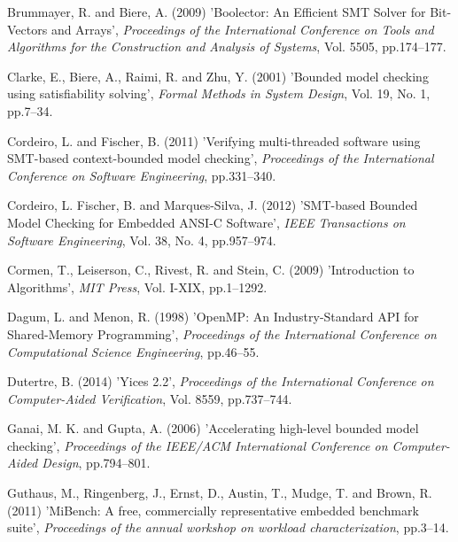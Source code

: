 \documentclass{doublecol-new}
\theoremstyle{TH}{
\newtheorem{lemma}{Lemma}
\newtheorem{theorem}[lemma]{Theorem}
\newtheorem{corrolary}[lemma]{Corrolary}
\newtheorem{conjecture}[lemma]{Conjecture}
\newtheorem{proposition}[lemma]{Proposition}
\newtheorem{claim}[lemma]{Claim}
\newtheorem{stheorem}[lemma]{Wrong Theorem}
\newtheorem{algorithm}{Algorithm}
}
\theoremstyle{THrm}{
\newtheorem{definition}{Definition}[section]
\newtheorem{question}{Question}[section]
\newtheorem{remark}{Remark}
\newtheorem{scheme}{Scheme}
}
\theoremstyle{THhit}{
\newtheorem{case}{Case}[section]
}
\begin{document}
\begin{thebibliography}{10}
Brummayer, R. and Biere, A. (2009) 'Boolector: An Efficient SMT Solver for Bit-Vectors and Arrays', {\it Proceedings of the International Conference on Tools and Algorithms for the Construction and Analysis of Systems}, Vol. 5505, pp.174--177.

Clarke, E., Biere, A., Raimi, R. and Zhu, Y. (2001) 'Bounded model checking using satisfiability solving', {\it Formal Methods in System Design}, Vol. 19, No. 1, pp.7--34.

Cordeiro, L. and Fischer, B. (2011) 'Verifying multi-threaded software using SMT-based context-bounded model checking', {\it Proceedings of the International Conference on Software Engineering}, pp.331--340.

Cordeiro, L. Fischer, B. and Marques-Silva, J. (2012) 'SMT-based Bounded Model Checking for Embedded ANSI-C Software', {\it IEEE Transactions on Software Engineering}, Vol. 38, No. 4, pp.957--974.


Cormen, T., Leiserson, C., Rivest, R. and Stein, C. (2009) 'Introduction to Algorithms', {\it MIT Press}, Vol. I-XIX, pp.1--1292.

Dagum, L. and Menon, R. (1998) 'OpenMP: An Industry-Standard API for Shared-Memory Programming', {\it Proceedings of the International Conference on Computational Science Engineering}, pp.46--55.

Dutertre, B. (2014) 'Yices 2.2', {\it Proceedings of the International Conference on Computer-Aided Verification}, Vol. 8559, pp.737--744.

Ganai, M. K. and Gupta, A. (2006) 'Accelerating high-level bounded model checking', {\it Proceedings of the IEEE/ACM International Conference on Computer-Aided Design}, pp.794--801.

Guthaus, M., Ringenberg, J., Ernst, D., Austin, T., Mudge, T. and Brown, R. (2011) 'MiBench: A free, commercially representative embedded benchmark suite', {\it Proceedings of the annual workshop on workload characterization}, pp.3--14.


\end{thebibliography}
\end{document}
